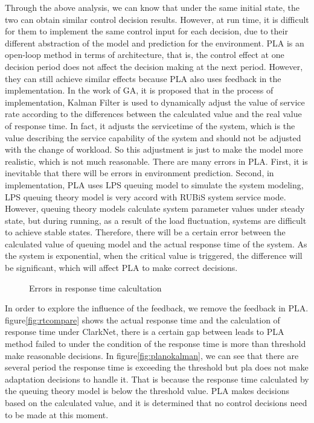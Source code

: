 \documentclass[sigconf]{acmart}
\begin{document}
Through the above analysis, we can know that under the same initial state, the two can obtain similar control decision results.
However, at run time, it is difficult for them to implement the same control input for each decision, due to their different abstraction of the model and prediction for the environment.
PLA is an open-loop method in terms of architecture, that is, the control effect at one decision period does not affect the decision making at the next period.
However, they can still achieve similar effects because PLA also uses feedback in the implementation.
In the work of GA, it is proposed that in the process of implementation, Kalman Filter is used to dynamically adjust the value of service rate according to the differences between the calculated value and the real value of response time. In fact, it adjusts the servicetime of the system, which is the value describing the service capability of the system and should not be adjusted with the change of workload. So this adjustment is just to make the model more realistic, which is not much reasonable.
There are many errors in PLA. First, it is inevitable that there will be errors in environment prediction. Second, in implementation, PLA uses LPS queuing  model to simulate the system modeling, LPS queuing theory model is very accord with RUBiS system service mode. However, queuing theory models calculate system parameter values under steady state, but during running, as a result of the load fluctuation, systems are difficult to achieve stable states.
Therefore, there will be a certain error between the calculated value of queuing model and the actual response time of the system. As the system is exponential, when the critical value is triggered, the difference will be significant, which will affect PLA to make correct decisions.
\begin{figure}[h]
	\centering
	\caption{Errors in response time calcultation}
\end{figure}
In order to explore the influence of the feedback, we remove the feedback in PLA.
figure\ref{fig:rtcompare} shows the actual response time and the calculation of response time under ClarkNet, there is a certain gap between leads to PLA method failed to under the condition of the response time is more than threshold make reasonable decisions. In figure\ref{fig:planokalman}, we can see that there are several period the response time is exceeding the threshold but pla does not make adaptation decisions to handle it. That is because the response time calculated by the queuing theory model is below the threshold value. PLA makes decisions based on the calculated value, and it is determined that no control decisions need to be made at this moment.
\end{document}
